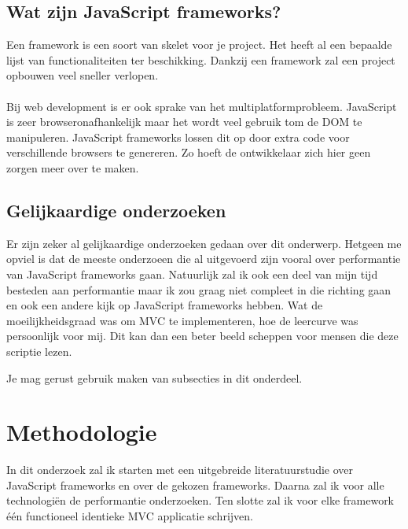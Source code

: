 \subsection{Wat zijn JavaScript frameworks?}

Een framework is een soort van skelet voor je project. Het heeft al een bepaalde lijst van functionaliteiten ter beschikking. Dankzij een framework zal een project opbouwen veel sneller verlopen.\\
\\
Bij web development is er ook sprake van het multiplatformprobleem. JavaScript is zeer browseronafhankelijk maar het wordt veel gebruik tom de DOM te manipuleren. JavaScript frameworks lossen dit op door extra code voor verschillende browsers te genereren. Zo hoeft de ontwikkelaar zich hier geen zorgen meer over te maken. \autocite{javascriptframework}

\subsection{Gelijkaardige onderzoeken}

Er zijn zeker al gelijkaardige onderzoeken gedaan over dit onderwerp. Hetgeen me  opviel is dat de meeste onderzoeen die al uitgevoerd zijn vooral over performantie van JavaScript frameworks gaan. Natuurlijk zal ik ook een deel van mijn tijd besteden aan performantie maar ik zou graag niet compleet in die richting gaan en ook een andere kijk op JavaScript frameworks hebben. Wat de moeilijkheidsgraad was om MVC te implementeren, hoe de leercurve was persoonlijk voor mij. Dit kan dan een beter beeld scheppen voor mensen die deze scriptie lezen.


Je mag gerust gebruik maken van subsecties in dit onderdeel.

\section{Methodologie}
\label{sec:methodologie}

In dit onderzoek zal ik starten met een uitgebreide literatuurstudie over JavaScript frameworks en over de gekozen frameworks. Daarna zal ik voor alle technologiën de performantie onderzoeken. Ten slotte zal ik voor elke framework één functioneel identieke MVC applicatie schrijven.

